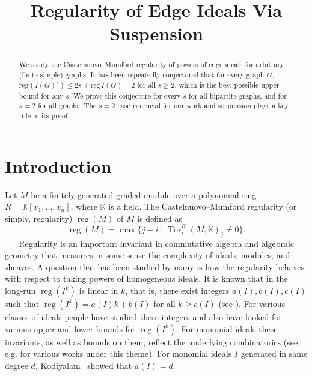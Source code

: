 \documentclass[ALCO,published]{cedram}
\title{Regularity of Edge Ideals Via Suspension}
\author[\initial{A.}  Banerjee]{\firstname{Arindam}  \lastname{Banerjee}}
\author[\initial{E.}  Nevo]{\firstname{Eran}  \lastname{Nevo}}
\numberwithin{equation}{section}
\newcommand \reg{\operatorname{reg}}
\newcommand \Tor{\operatorname{Tor}}
\newcommand \K{\mathbb{K}}
\begin{document}
\begin{abstract}
  We study the Castelnuovo--Mumford regularity of powers of edge ideals for arbitrary (finite simple) graphs. It has been repeatedly conjectured that for every graph $G$,  $\mathrm{reg}(I(G)^s) \leq 2s+\mathrm{reg}\, I(G)-2$ for all $s\geq 2$, which is the best possible upper bound for any $s$. We prove this conjecture for every $s$ for all bipartite graphs, and for $s=2$ for all graphs. The $s=2$ case is crucial for our work and suspension plays a key role in its proof.
\end{abstract}


\maketitle

\section{Introduction}
Let $M$ be a finitely generated graded module over a polynomial ring $R = \K[x_1,\ldots,x_n]$, where
$\K$ is a field. The Castelnuovo--Mumford regularity (or simply, regularity) $\reg(M)$ of $M$
is defined as
$$
 \reg(M)=\max \{j-i \mid \Tor_i^R(M, \K)_j \neq 0\}.
$$
 $\text{  }$ $\text{  }$Regularity  is an important invariant in commutative algebra and algebraic geometry that measures in some sense the complexity of ideals, modules, and sheaves. A question that has been studied by many is how the regularity behaves with respect to taking powers of homogeneous ideals. It is known that in the long-run $\reg(I^k)$ is linear in $k$, that is, there exist integers $a(I), b(I), c(I)$ such that $\reg(I^k) = a(I)k + b(I)$ for all $k\geq c(I)$ (see \cite{CHT,vijay}). For various classes of ideals people have studied these integers and also have looked for various upper and lower bounds for $\reg(I^k)$.
 For monomial ideals these invariants, as well as bounds on them, reflect the underlying combinatorics (see e.g. \cite{BBH17,ha_adam2,Herzog'sBook,ms2005,MorVill,Nevo} for various works under this theme).
 For monomial ideals $I$ generated in same degree $d$, Kodiyalam~\cite{vijay} showed that $a(I)=d$.
\end{document}
